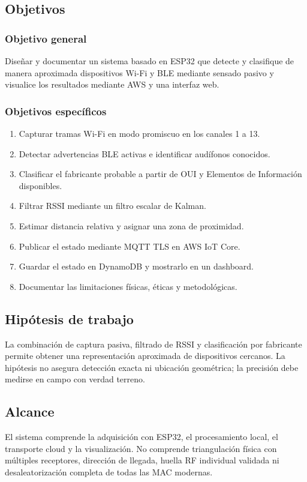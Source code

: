 \documentclass[12pt,a4paper]{article}
\begin{document}
\subsection{Objetivos}
\subsubsection{Objetivo general}
Diseñar y documentar un sistema basado en ESP32 que detecte y clasifique de manera aproximada dispositivos Wi-Fi y BLE mediante sensado pasivo y visualice los resultados mediante AWS y una interfaz web.

\subsubsection{Objetivos específicos}
\begin{enumerate}
\item Capturar tramas Wi-Fi en modo promiscuo en los canales 1 a 13.
\item Detectar advertencias BLE activas e identificar audífonos conocidos.
\item Clasificar el fabricante probable a partir de OUI y Elementos de Información disponibles.
\item Filtrar RSSI mediante un filtro escalar de Kalman.
\item Estimar distancia relativa y asignar una zona de proximidad.
\item Publicar el estado mediante MQTT TLS en AWS IoT Core.
\item Guardar el estado en DynamoDB y mostrarlo en un dashboard.
\item Documentar las limitaciones físicas, éticas y metodológicas.
\end{enumerate}

\subsection{Hipótesis de trabajo}
La combinación de captura pasiva, filtrado de RSSI y clasificación por fabricante permite obtener una representación aproximada de dispositivos cercanos. La hipótesis no asegura detección exacta ni ubicación geométrica; la precisión debe medirse en campo con verdad terreno.

\subsection{Alcance}
El sistema comprende la adquisición con ESP32, el procesamiento local, el transporte cloud y la visualización. No comprende triangulación física con múltiples receptores, dirección de llegada, huella RF individual validada ni desaleatorización completa de todas las MAC modernas.
\end{document}
